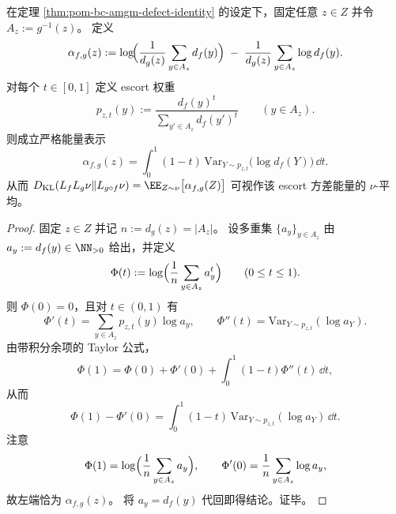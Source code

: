 \begin{proposition}\label{prop:pom-bc-amgm-defect-escort-variance-energy}
在定理 \ref{thm:pom-bc-amgm-defect-identity} 的设定下，固定任意 \(z\in Z\) 并令 \(A_z:=g^{-1}(z)\)。
定义
\[
\alpha_{f,g}(z)
:=\log\!\Bigl(\frac{1}{d_g(z)}\sum_{y\in A_z}d_f(y)\Bigr)
\;-\;
\frac{1}{d_g(z)}\sum_{y\in A_z}\log d_f(y).
\]
对每个 \(t\in[0,1]\) 定义 escort 权重
\[
p_{z,t}(y):=\frac{d_f(y)^t}{\sum_{y'\in A_z}d_f(y')^t}\qquad(y\in A_z).
\]
则成立严格能量表示
\[
\boxed{\;
\alpha_{f,g}(z)
=\int_0^1 (1-t)\,\mathrm{Var}_{Y\sim p_{z,t}}\!\bigl(\log d_f(Y)\bigr)\,\dd t.\;}
\]
从而
\(
D_{\mathrm{KL}}(L_fL_g\nu\|L_{g\circ f}\nu)=\EE_{Z\sim\nu}\bigl[\alpha_{f,g}(Z)\bigr]
\)
可视作该 escort 方差能量的 \(\nu\)-平均。
\end{proposition}
\begin{proof}
固定 \(z\in Z\) 并记 \(n:=d_g(z)=|A_z|\)。
设多重集 \(\{a_y\}_{y\in A_z}\) 由 \(a_y:=d_f(y)\in\NN_{>0}\) 给出，并定义
\[
\Phi(t):=\log\Bigl(\frac{1}{n}\sum_{y\in A_z}a_y^{t}\Bigr)\qquad(0\le t\le 1).
\]
则 \(\Phi(0)=0\)，且对 \(t\in(0,1)\) 有
\[
\Phi'(t)=\sum_{y\in A_z}p_{z,t}(y)\log a_y,\qquad
\Phi''(t)=\mathrm{Var}_{Y\sim p_{z,t}}(\log a_Y).
\]
由带积分余项的 Taylor 公式，
\[
\Phi(1)=\Phi(0)+\Phi'(0)+\int_0^1(1-t)\Phi''(t)\,\dd t,
\]
从而
\[
\Phi(1)-\Phi'(0)=\int_0^1(1-t)\,\mathrm{Var}_{Y\sim p_{z,t}}(\log a_Y)\,\dd t.
\]
注意
\[
\Phi(1)=\log\Bigl(\frac1n\sum_{y\in A_z}a_y\Bigr),\qquad
\Phi'(0)=\frac1n\sum_{y\in A_z}\log a_y,
\]
故左端恰为 \(\alpha_{f,g}(z)\)。
将 \(a_y=d_f(y)\) 代回即得结论。证毕。
\end{proof}

\endinput
